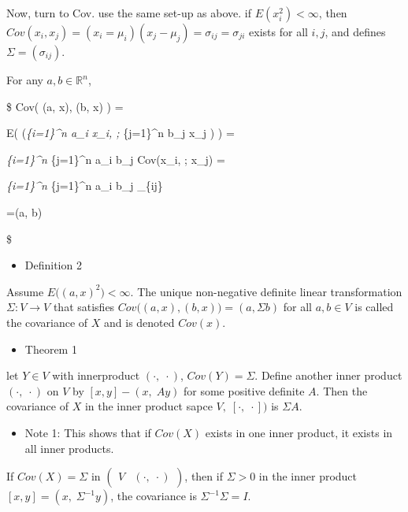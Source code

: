 \documentclass[
]{book}
\providecommand{\tightlist}{%
  \setlength{\itemsep}{0pt}\setlength{\parskip}{0pt}}
\begin{document}
{{{Now, turn to Cov. use the same set-up as above. if \(E(x_i^2)<\infty\), then \(Cov(x_i , x_j) = (x_i = \mu_i) (x_j - \mu_j) = \sigma_{ij} = \sigma_{ji}\) exists for all \(i,j\), and defines \(\Sigma = (\sigma_{ij})\).

For any \(a, b \in \mathbb{R}^n\),

\$
Cov\Big( (a, x), (b, x) \Big) =

E\Bigg( \Big(\sum\emph{\{i=1\}\^{}n a\_i x\_i, ; \sum}\{j=1\}\^{}n b\_j x\_j \Big) \Bigg) =

\sum\emph{\{i=1\}\^{}n \sum}\{j=1\}\^{}n a\_i b\_j \ast Cov(x\_i, ; x\_j) =

\sum\emph{\{i=1\}\^{}n \sum}\{j=1\}\^{}n a\_i b\_j \ast \sigma\_\{ij\}

=(a, \Sigma b)

\$

\begin{itemize}
\tightlist
\item
  Definition 2
\end{itemize}

Assume \(E\Bigg( (a,x)^2 \Bigg) < \infty\). The unique non-negative definite linear transformation \(\Sigma: V \rightarrow V\) that satisfies \(Cov\Bigg( (a,x), (b,x) \Bigg) = (a, \Sigma b)\) for all \(a, b \in V\) is called the covariance of \(X\) and is denoted \(Cov(x)\).

\begin{itemize}
\tightlist
\item
  Theorem 1
\end{itemize}

let \(Y \in V\) with innerproduct \((\cdot, \; \cdot)\), \(Cov(Y)=\Sigma\). Define another inner product \((\cdot, \; \cdot )\) on \(V\) by \([x,y] - (x, \; Ay)\) for some positive definite \(A\). Then the covariance of \(X\) in the inner product sapce \(V, \; [\cdot, \; \cdot])\) is \(\Sigma A\).

\begin{itemize}
\tightlist
\item
  Note 1:
  This shows that if \(Cov(X)\) exists in one inner product, it exists in all inner products.
\end{itemize}

If \(Cov(X)=\Sigma\) in \(\begin{pmatrix} V & (\cdot, \; \cdot) \end{pmatrix}\), then if \(\Sigma > 0\) in the inner product \([x,y] = (x, \; \Sigma^{-1}y)\), the covariance is \(\Sigma^{-1} \Sigma = I\).

}}}
\end{document}

